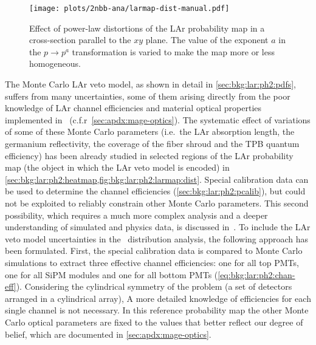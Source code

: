 \begin{description}[wide]

    \begin{figure}
      \centering
      \texttt{[image: plots/2nbb-ana/larmap-dist-manual.pdf]}
      \caption{%
        Effect of power-law distortions of the LAr probability map in a cross-section
        parallel to the $xy$ plane. The value of the exponent $a$ in the $p \rightarrow
        p^a$ transformation is varied to make the map more or less homogeneous.
      }\label{fig:2nbb-ana:larmap-dist-showoff}
    \end{figure}

  \item[LAr veto model] The Monte Carlo LAr veto model, as shown in detail in
    \cref{sec:bkg:lar:ph2:pdfs}, suffers from many uncertainties, some of them arising
    directly from the poor knowledge of LAr channel efficiencies and material optical
    properties implemented in \mage\ (c.f.r~\cref{sec:apdx:mage-optics}). The systematic
    effect of variations of some of these Monte Carlo parameters (i.e.~the LAr absorption
    length, the germanium reflectivity, the coverage of the fiber shroud and the TPB
    quantum efficiency) has been already studied in selected regions of the LAr
    probability map (the object in which the LAr veto model is encoded) in
    \cref{sec:bkg:lar:ph2:heatmap,fig:bkg:lar:ph2:larmap:dist}. Special calibration data
    can be used to determine the channel efficiencies (\cref{sec:bkg:lar:ph2:pcalib}), but
    could not be exploited to reliably constrain other Monte Carlo parameters. This second
    possibility, which requires a much more complex analysis and a deeper understanding of
    simulated and physics data, is discussed in~\cite{Wiesinger2021}.
    \newpar
    To include the LAr veto model uncertainties in the \nnbb\ distribution analysis, the
    following approach has been formulated. First, the special calibration data is
    compared to Monte Carlo simulations to extract three effective channel efficiencies:
    one for all top PMTs, one for all SiPM modules and one for all bottom PMTs
    (\cref{eq:bkg:lar:ph2:chan-eff}). Considering the cylindrical symmetry of the problem
    (a set of detectors arranged in a cylindrical array), A more detailed knowledge of
    efficiencies for each single channel is not necessary. In this reference probability
    map the other Monte Carlo optical parameters are fixed to the values that better
    reflect our degree of belief, which are documented in \cref{sec:apdx:mage-optics}.

\end{description}

